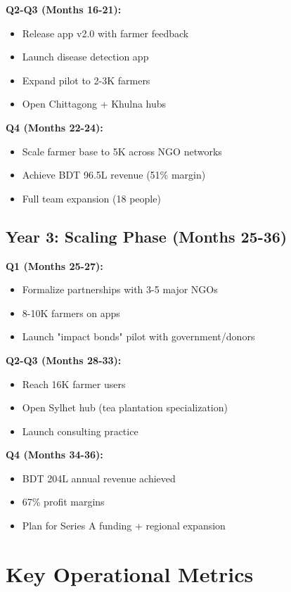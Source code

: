 \textbf{Q2-Q3 (Months 16-21):}
\begin{itemize}
    \item Release app v2.0 with farmer feedback
    \item Launch disease detection app
    \item Expand pilot to 2-3K farmers
    \item Open Chittagong + Khulna hubs
\end{itemize}

\textbf{Q4 (Months 22-24):}
\begin{itemize}
    \item Scale farmer base to 5K across NGO networks
    \item Achieve BDT 96.5L revenue (51\% margin)
    \item Full team expansion (18 people)
\end{itemize}

\subsection{Year 3: Scaling Phase (Months 25-36)}

\textbf{Q1 (Months 25-27):}
\begin{itemize}
    \item Formalize partnerships with 3-5 major NGOs
    \item 8-10K farmers on apps
    \item Launch "impact bonds" pilot with government/donors
\end{itemize}

\textbf{Q2-Q3 (Months 28-33):}
\begin{itemize}
    \item Reach 16K farmer users
    \item Open Sylhet hub (tea plantation specialization)
    \item Launch consulting practice
\end{itemize}

\textbf{Q4 (Months 34-36):}
\begin{itemize}
    \item BDT 204L annual revenue achieved
    \item 67\% profit margins
    \item Plan for Series A funding + regional expansion
\end{itemize}

\section{Key Operational Metrics}

